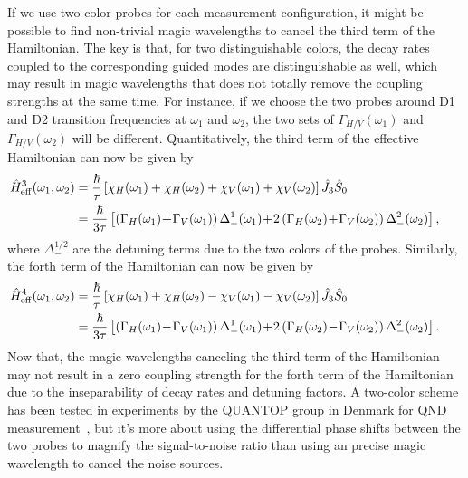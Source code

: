If we use two-color probes for each measurement configuration, it might be possible to find non-trivial magic wavelengths to cancel the third term of the Hamiltonian. The key is that, for two distinguishable colors, the decay rates coupled to the corresponding guided modes are distinguishable as well, which may result in magic wavelengths that does not totally remove the coupling strengths at the same time. For instance, if we choose the two probes around D1 and D2 transition frequencies at $ \omega_1 $ and $ \omega_2 $, the two sets of $ \Gamma_{H/V}(\omega_1) $ and $ \Gamma_{H/V}(\omega_2) $ will be different. Quantitatively, the third term of the effective Hamiltonian can now be given by
\begin{align}
\!\!\!\!\!\!\!\!\!\!\hat{H}_{\rm eff}^3(\omega_1,\omega_2) &= \frac{\hbar}{\tau} \left[\chi_H(\omega_1)+\chi_H(\omega_2) + \chi_V(\omega_1)+\chi_V(\omega_2) \right] \hat{J}_3\hat{S}_0\\
&= \frac{\hbar}{3\tau} \left[  \left( \Gamma_H(\omega_1)\!+\!\Gamma_V(\omega_1) \right)\Delta_-^1(\omega_1) \!+\! 2\left( \Gamma_H(\omega_2)\!+\!\Gamma_V(\omega_2) \right)\Delta_-^2(\omega_2) \right] ,
\end{align}
where $ \Delta_-^{1/2} $ are the detuning terms due to the two colors of the probes. Similarly, the forth term of the Hamiltonian can now be given by
\begin{align}
\!\!\!\!\!\!\!\!\!\!\hat{H}_{\rm eff}^4(\omega_1,\omega_2) &= \frac{\hbar}{\tau} \left[\chi_H(\omega_1)+\chi_H(\omega_2) - \chi_V(\omega_1)-\chi_V(\omega_2) \right] \hat{J}_3\hat{S}_0\\
&= \frac{\hbar}{3\tau} \left[  \left( \Gamma_H(\omega_1)\!-\!\Gamma_V(\omega_1) \right)\Delta_-^1(\omega_1) \!+\! 2\left( \Gamma_H(\omega_2)\!-\!\Gamma_V(\omega_2) \right)\Delta_-^2(\omega_2) \right] .
\end{align}
Now that, the magic wavelengths canceling the third term of the Hamiltonian may not result in a zero coupling strength for the forth term of the Hamiltonian due to the inseparability of decay rates and detuning factors. A two-color scheme has been tested in experiments by the QUANTOP group in Denmark for QND measurement~\cite{Beguin2014}, but it's more about using the differential phase shifts between the two probes to magnify the signal-to-noise ratio than using an precise magic wavelength to cancel the noise sources. 


